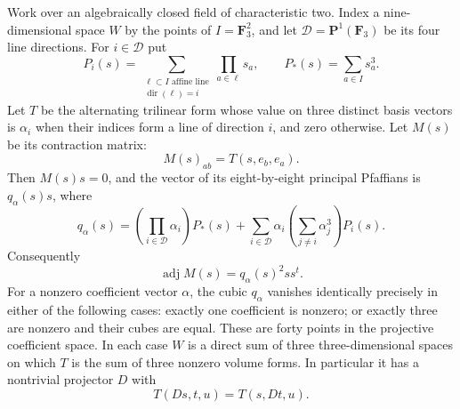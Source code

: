 \begin{lemma}
\label{lem:DE-A3-theta-pfaffian}
Work over an algebraically closed field of characteristic two.  Index a
nine-dimensional space $W$ by the points of $I=\mathbf F_3^2$, and let
$\mathcal D=\mathbf P^1(\mathbf F_3)$ be its four line directions.
For $i\in\mathcal D$ put
\[
 P_i(s)=\sum_{\substack{\ell\subset I\text{ affine line}\\
                         \operatorname{dir}(\ell)=i}}
                           \prod_{a\in\ell}s_a,
 \qquad P_*(s)=\sum_{a\in I}s_a^3.
\]
Let $T$ be the alternating trilinear form whose value on three distinct
basis vectors is $\alpha_i$ when their indices form a line of direction
$i$, and zero otherwise.  Let $M(s)$ be its contraction matrix:
\[
             M(s)_{ab}=T(s,e_b,e_a).
\]
Then $M(s)s=0$, and the vector of its eight-by-eight principal
Pfaffians is $q_\alpha(s)s$, where
\begin{equation}\label{eq:DE-A3-pfaffian-cubic}
 q_\alpha(s)=
   \left(\prod_{i\in\mathcal D}\alpha_i\right)P_*(s)
   +\sum_{i\in\mathcal D}
       \alpha_i\left(\sum_{j\ne i}\alpha_j^3\right)P_i(s).
\end{equation}
Consequently
\[
                \operatorname{adj}M(s)=q_\alpha(s)^2ss^t.
\]
For a nonzero coefficient vector $\alpha$, the cubic $q_\alpha$ vanishes
identically precisely in either of the following cases: exactly one
coefficient is nonzero; or exactly three are nonzero and their cubes are
equal.  These are forty points in the projective coefficient space.
In each case $W$ is a direct sum of three three-dimensional spaces on
which $T$ is the sum of three nonzero volume forms.  In particular it
has a nontrivial projector $D$ with
\[
                         T(Ds,t,u)=T(s,Dt,u).
\]
\end{lemma}
